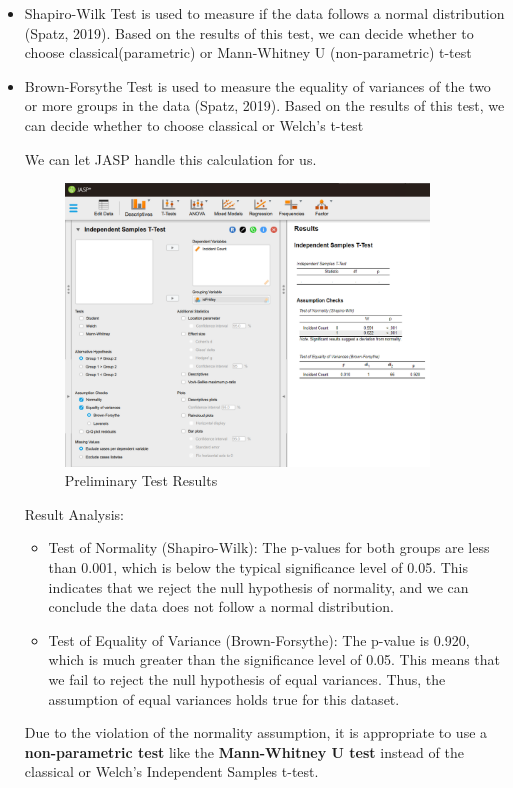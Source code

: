 \documentclass{article}
\begin{document}
\begin{itemize}
    \item Shapiro-Wilk Test is used to measure if the data follows a normal distribution (Spatz, 2019). Based on the results of this test, we can decide whether to choose classical(parametric) or Mann-Whitney U (non-parametric) t-test

    \item Brown-Forsythe Test is used to measure the equality of variances of the two or more groups in the data (Spatz, 2019). Based on the results of this test, we can decide whether to choose classical or Welch's t-test
    
    We can let JASP handle this calculation for us.

    \begin{figure}[H]
        \centering
        \includegraphics[width=0.7\linewidth, height=7.5cm]{Screenshot 2024-09-27 230725.png}
        \caption{Preliminary Test Results}
        \label{fig:enter-label}
    \end{figure}

    Result Analysis:

    \begin{itemize}
        \item Test of Normality (Shapiro-Wilk): The p-values for both groups are less than 0.001, which is below the typical significance level of 0.05. This indicates that we reject the null hypothesis of normality, and we can conclude the data does not follow a normal distribution.

        \item Test of Equality of Variance (Brown-Forsythe): The p-value is 0.920, which is much greater than the significance level of 0.05. This means that we fail to reject the null hypothesis of equal variances. Thus, the assumption of equal variances holds true for this dataset.
    \end{itemize}

    Due to the violation of the normality assumption, it is appropriate to use a \textbf{non-parametric test} like the\textbf{ Mann-Whitney U test} instead of the classical or Welch's Independent Samples t-test.
    
\end{itemize}
\end{document}
